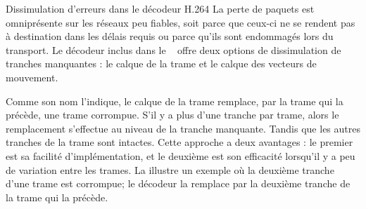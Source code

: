\begin{section}{Dissimulation d'erreurs dans le décodeur H.264}
\label{sect-dissimulation}
La perte de paquets est omniprésente sur les réseaux peu fiables, soit parce que
ceux-ci ne se rendent pas à destination dans les délais requis ou parce qu'ils
sont endommagés lors du transport. Le décodeur inclus dans le \ltCodec~ offre
deux options de dissimulation de tranches manquantes : le calque de la
trame  et le calque des vecteurs de
mouvement.

Comme son nom l'indique, le calque de la trame remplace, par la trame qui la
précède, une trame corrompue. S'il y a plus d'une tranche par trame, alors le
remplacement s'effectue au niveau de la tranche manquante. Tandis que les autres
tranches de la trame sont intactes. Cette approche a deux avantages : le premier
est sa facilité d'implémentation, et le deuxième est son efficacité lorsqu'il y
a peu de variation entre les trames. La  illustre un exemple
où la deuxième tranche d'une trame est corrompue; le décodeur la remplace par la
deuxième tranche de la trame qui la précède.


\end{section}
